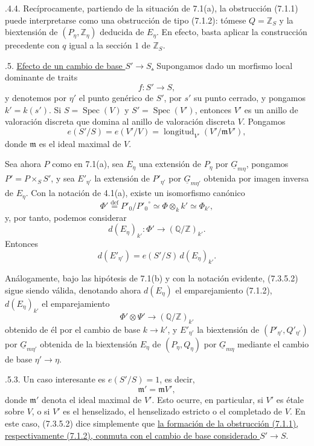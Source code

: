 
\smallskip
{}.4.4. Recíprocamente, partiendo de la situación de 7.1(a),
la obstrucción (7.1.1) puede interpretarse como una obstrucción de tipo
(7.1.2): tómese $Q=\mathbb Z_S$ y la biextensión de
$(P_\eta,\mathbb Z_\eta)$ deducida de $E_\eta$. En efecto, basta aplicar
la construcción precedente con $q$ igual a la sección $1$ de
$\mathbb Z_S$.

\medskip
{}.5. \underline{Efecto de un cambio de base $S'\to S$.}
Supongamos dado un morfismo local dominante de traits
\[
 f:S'\longrightarrow S,
\]
y denotemos por $\eta'$ el punto genérico de $S'$, por $s'$ su punto
cerrado, y pongamos $k'=k(s')$. Si $S=\operatorname{Spec}(V)$ y
$S'=\operatorname{Spec}(V')$, entonces $V'$ es un anillo de valoración
discreta que domina al anillo de valoración discreta $V$. Pongamos
\begin{equation}\tag{7.3.5.1}
 e(S'/S)=e(V'/V)=
 \operatorname{longitud}_{V'}(V'/\mathfrak m V'),
\end{equation}
donde $\mathfrak m$ es el ideal maximal de $V$.

Sea ahora $P$ como en 7.1(a), sea $E_\eta$ una extensión de $P_\eta$
por $\underline G_{m\eta}$, pongamos $P'=P\times_S S'$, y sea
$E'_{\eta'}$ la extensión de $P'_{\eta'}$ por
$\underline G_{m\eta'}$ obtenida por imagen inversa de $E_\eta$. Con
la notación de 4.1(a), existe un isomorfismo canónico
\[
 \Phi'\overset{\mathrm{def}}{=}P'_0/{P'_0}^{\circ}
 \simeq\Phi\otimes_k k'\simeq\Phi_{k'},
\]
y, por tanto, podemos considerar
\[
 d(E_\eta)_{k'}:\Phi'\longrightarrow(\mathbb Q/\mathbb Z)_{k'}.
\]
Entonces
\begin{equation}\tag{7.3.5.2}
 d(E'_{\eta'})=e(S'/S)\,d(E_\eta)_{k'}.
\end{equation}


Análogamente, bajo las hipótesis de 7.1(b) y con la notación evidente,
(7.3.5.2) sigue siendo válida, denotando ahora $d(E_\eta)$ el
emparejamiento (7.1.2), $d(E_\eta)_{k'}$ el emparejamiento
\[
 \Phi'\otimes\Psi'\longrightarrow(\mathbb Q/\mathbb Z)_{k'}
\]
obtenido de él por el cambio de base $k\to k'$, y $E'_{\eta'}$ la
biextensión de $(P'_{\eta'},Q'_{\eta'})$ por
$\underline G_{m\eta'}$ obtenida de la biextensión $E_\eta$ de
$(P_\eta,Q_\eta)$ por $\underline G_{m\eta}$ mediante el cambio de
base $\eta'\to\eta$.

\smallskip
{}.5.3. Un caso interesante es $e(S'/S)=1$, es decir,
\[
 \mathfrak m'=\mathfrak m V',
\]
donde $\mathfrak m'$ denota el ideal maximal de $V'$. Esto ocurre, en
particular, si $V'$ es étale sobre $V$, o si $V'$ es el henselizado, el
henselizado estricto o el completado de $V$. En este caso, (7.3.5.2)
dice simplemente que \underline{la formación de la obstrucción (7.1.1),
respectivamente (7.1.2), conmuta con el cambio de base considerado
$S'\to S$}.

